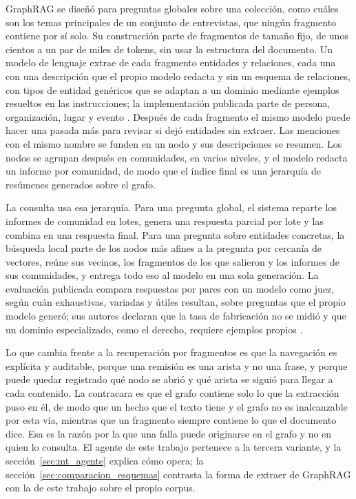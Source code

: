 \documentclass[12pt,a4paper]{report}
\begin{document}
GraphRAG se diseñó para preguntas globales sobre una colección, como cuáles son los temas principales de un conjunto de entrevistas, que ningún fragmento contiene por sí solo. Su construcción parte de fragmentos de tamaño fijo, de unos cientos a un par de miles de tokens, sin usar la estructura del documento. Un modelo de lenguaje extrae de cada fragmento entidades y relaciones, cada una con una descripción que el propio modelo redacta y sin un esquema de relaciones, con tipos de entidad genéricos que se adaptan a un dominio mediante ejemplos resueltos en las instrucciones; la implementación publicada parte de persona, organización, lugar y evento \cite{microsoft2024graphrag}. Después de cada fragmento el mismo modelo puede hacer una pasada más para revisar si dejó entidades sin extraer. Las menciones con el mismo nombre se funden en un nodo y sus descripciones se resumen. Los nodos se agrupan después en comunidades, en varios niveles, y el modelo redacta un informe por comunidad, de modo que el índice final es una jerarquía de resúmenes generados sobre el grafo.

La consulta usa esa jerarquía. Para una pregunta global, el sistema reparte los informes de comunidad en lotes, genera una respuesta parcial por lote y las combina en una respuesta final. Para una pregunta sobre entidades concretas, la búsqueda local parte de los nodos más afines a la pregunta por cercanía de vectores, reúne sus vecinos, los fragmentos de los que salieron y los informes de sus comunidades, y entrega todo eso al modelo en una sola generación. La evaluación publicada compara respuestas por pares con un modelo como juez, según cuán exhaustivas, variadas y útiles resultan, sobre preguntas que el propio modelo generó; sus autores declaran que la tasa de fabricación no se midió y que un dominio especializado, como el derecho, requiere ejemplos propios \cite{edge2024graphrag}.

Lo que cambia frente a la recuperación por fragmentos es que la navegación es explícita y auditable, porque una remisión es una arista y no una frase, y porque puede quedar registrado qué nodo se abrió y qué arista se siguió para llegar a cada contenido. La contracara es que el grafo contiene solo lo que la extracción puso en él, de modo que un hecho que el texto tiene y el grafo no es inalcanzable por esta vía, mientras que un fragmento siempre contiene lo que el documento dice. Esa es la razón por la que una falla puede originarse en el grafo y no en quien lo consulta. El agente de este trabajo pertenece a la tercera variante, y la sección~\ref{sec:mt_agente} explica cómo opera; la sección~\ref{sec:comparacion_esquemas} contrasta la forma de extraer de GraphRAG con la de este trabajo sobre el propio corpus.
\end{document}
